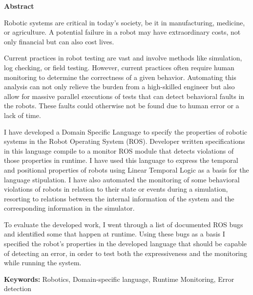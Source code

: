 \vspace*{2cm}
\begin{center}
\Large \bf Abstract
\end{center}
\vspace*{1cm} \setlength{\baselineskip}{0.6cm}

Robotic systems are critical in today's society, be it in manufacturing, medicine, or agriculture. A potential failure in a robot may have extraordinary costs, not only financial but can also cost lives.

Current practices in robot testing are vast and involve methods like simulation, log checking, or field testing. However, current practices often require human monitoring to determine the correctness of a given behavior. Automating this analysis can not only relieve the burden from a high-skilled engineer but also allow for massive parallel executions of tests that can detect behavioral faults in the robots. These faults could otherwise not be found due to human error or a lack of time.
    
I have developed a Domain Specific Language to specify the properties of robotic systems in the Robot Operating System (ROS). Developer written specifications in this language compile to a monitor ROS module that detects violations of those properties in runtime. I have used this language to express the temporal and positional properties of robots using Linear Temporal Logic as a basis for the language stipulation. I have also automated the monitoring of some behavioral violations of robots in relation to their state or events during a simulation, resorting to relations between the internal information of the system and the corresponding information in the simulator.

To evaluate the developed work, I went through a list of documented ROS bugs and identified some that happen at runtime. Using these bugs as a basis I specified the robot's properties in the developed language that should be capable of detecting an error, in order to test both the expressiveness and the monitoring while running the system.

\vfill

\begin{flushleft}
\textbf{Keywords:}
Robotics, Domain-specific language, Runtime Monitoring, Error detection
\end{flushleft}
